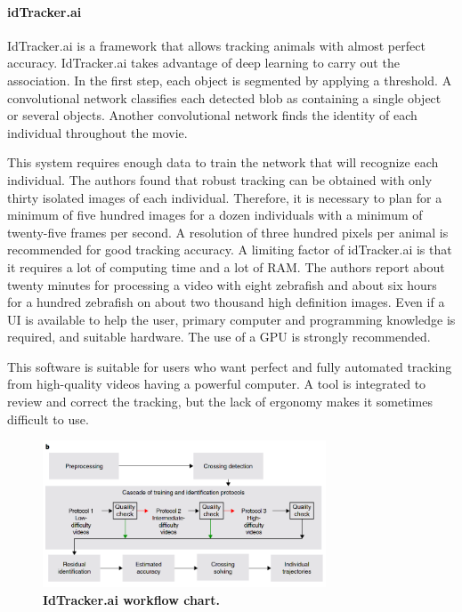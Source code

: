     \paragraph{idTracker.ai}
    IdTracker.ai \cite{romero2019idtracker} is a framework that allows tracking animals with almost perfect accuracy. IdTracker.ai takes advantage of deep learning to carry out the association. In the first step, each object is segmented by applying a threshold. A convolutional network classifies each detected blob as containing a single object or several objects. Another convolutional network finds the identity of each individual throughout the movie.

    This system requires enough data to train the network that will recognize each individual. The authors found that robust tracking can be obtained with only thirty isolated images of each individual. Therefore, it is necessary to plan for a minimum of five hundred images for a dozen individuals with a minimum of twenty-five frames per second. A resolution of three hundred pixels per animal is recommended for good tracking accuracy. A limiting factor of idTracker.ai is that it requires a lot of computing time and a lot of RAM. The authors report about twenty minutes for processing a video with eight zebrafish and about six hours for a hundred zebrafish on about two thousand high definition images. Even if a UI is available to help the user, primary computer and programming knowledge is required, and suitable hardware. The use of a GPU is strongly recommended.

    This software is suitable for users who want perfect and fully automated tracking from high-quality videos having a powerful computer. A tool is integrated to review and correct the tracking, but the lack of ergonomy makes it sometimes difficult to use.

    \begin{figure}[h]
    \centering
    \includegraphics[width=0.75\textwidth]{part_1/assets/idtrackerai.png}
    \caption{{\bf IdTracker.ai workflow chart.}}
    \label{part_1:idtrackerai}
    \end{figure}

